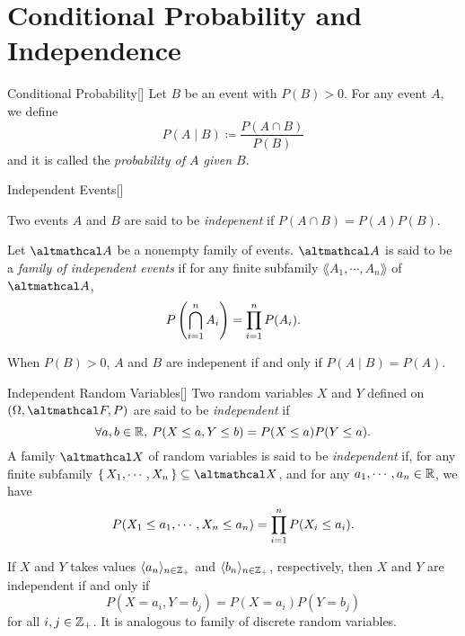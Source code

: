 \documentclass[../complex_variables_1.tex]{subfiles}
\begin{document}
\section{Conditional Probability and Independence}

\begin{Definition}{Conditional Probability}[]
    Let \(B\) be an event with \(P(B) > 0\).
    For any event \(A\), we define
    \[
        P(A \mid B) \coloneqq \frac{P(A \cap B)}{P(B)}
    \]
    and it is called the \emph{probability of \(A\) given \(B\)}.
\end{Definition}

\begin{Definition}{Independent Events}[]
\begin{enumerate}[label=(\arabic*)]
    \ii
    Two events \(A\) and \(B\) are said to be \emph{indepenent} if
    \(P(A \cap B) = P(A)P(B)\).

    \ii
    Let \(\mcal{A}\) be a nonempty family of events.
    \(\mcal{A}\) is said to be a \emph{family of independent events} if
    for any finite subfamily \(\lang A_1, \cdots, A_n \rang\) of \(\mcal{A}\),
    \[
        P\left( \bigcap_{i=1}^n A_i \right) = \prod_{i=1}^n P(A_i)\text.
    \]
\end{enumerate}
\end{Definition}

\begin{note}
    When \(P(B) > 0\), \(A\) and \(B\) are indepenent
    if and only if \(P(A \mid B) = P(A)\).
\end{note}

\begin{Definition}{Independent Random Variables}[]
    Two random variables \(X\) and \(Y\) defined on \((\Omega, \mcal{F}, P)\) are said to be
    \emph{independent}
    if
    \[
        \fall a, b \in \RR,\: P(X \le a, Y \le b) = P(X \le a) P(Y \le a)\text.
    \]
    A family \(\mcal{X}\) of random variables is said to be \emph{independent}
    if, for any finite subfamily \(\{\, X_1, \cdots, X_n \,\} \subseteq \mcal{X}\),
    and for any \(a_1, \cdots, a_n \in \RR\), we have
    \[
        P(X_1 \le a_1, \cdots, X_n \le a_n) = \prod_{i=1}^n P(X_i \le a_i)\text.
    \]
\end{Definition}

\begin{note}
    If \(X\) and \(Y\) takes values \(\lang a_n \rang_{n \in \ZZ_+}\)
    and \(\lang b_n \rang_{n \in \ZZ_+}\), respectively,
    then \(X\) and \(Y\) are independent if and only if
    \[
        P(X = a_i, Y = b_j) = P(X = a_i) P(Y = b_j)
    \]
    for all \(i, j \in \ZZ_+\). It is analogous to family of discrete random variables.
\end{note}
\end{document}
